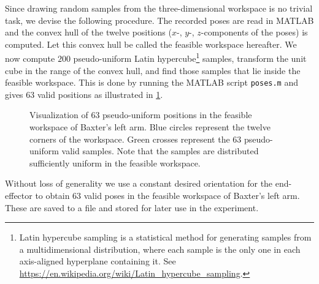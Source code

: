 \documentclass{scrartcl}
\begin{document}
        Since drawing random samples from the three-dimensional workspace is no trivial task, we devise the following procedure.
        The recorded poses are read in MATLAB and the convex hull of the twelve positions ($x$-, $y$-, $z$-components of the poses) is computed.
        Let this convex hull be called the feasible workspace hereafter.
        We now compute $200$ pseudo-uniform Latin hypercube\footnote{Latin hypercube sampling is a statistical method for generating samples from a  multidimensional distribution, where each sample is the only one in each axis-aligned hyperplane containing it. See \url{https://en.wikipedia.org/wiki/Latin_hypercube_sampling}.} samples, transform the unit cube in the range of the convex hull, and find those samples that lie inside the feasible workspace.
        This is done by running the MATLAB script \verb|poses.m| and gives $63$ valid positions as illustrated in \cref{fig:poses}.
        \begin{figure}
            \centering
            \caption{Visualization of $63$ pseudo-uniform positions in the feasible workspace of Baxter's left arm.
                Blue circles represent the twelve corners of the workspace.
                Green crosses represent the $63$ pseudo-uniform valid samples.
                Note that the samples are distributed sufficiently uniform in the feasible workspace.}
            \label{fig:poses}
        \end{figure}
        Without loss of generality we use a constant desired orientation for the end-effector to obtain $63$ valid poses in the feasible workspace of Baxter's left arm.
        These are saved to a file and stored for later use in the experiment.
        
\end{document}
